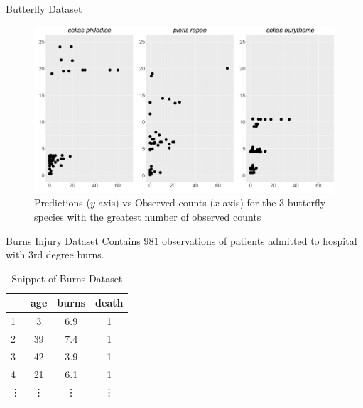 \documentclass[9pt,notes=hide]{beamer}
\begin{document}
\begin{frame}{Butterfly Dataset}
	\begin{figure}
		\centering
		\includegraphics[width = \textwidth]{figures/butterfly_3d_poisson.png}
		\caption{Predictions ($y$-axis) vs Observed counts ($x$-axis) for the $3$ butterfly species with the greatest number of observed counts}
		\label{fig:butterfly_3d}
	\end{figure}
\end{frame}



\begin{frame}{Burns Injury Dataset}
	Contains $981$ observations of patients admitted to hospital with 3rd degree burns.
	\begin{table}
		\centering
		\caption{Snippet of Burns Dataset \parencite{}}
		\begin{tabular}{lccc}
			\hline
			{}     & \textbf{age} & \textbf{burns} & \textbf{death} \\ \hline
			1      & 3            & 6.9            & 1              \\
			2      & 39           & 7.4            & 1              \\
			3      & 42           & 3.9            & 1              \\
			4      & 21           & 6.1            & 1              \\
			\vdots & \vdots       & \vdots         & \vdots         \\
			\hline
		\end{tabular}
	\end{table}
\end{frame}
\end{document}

